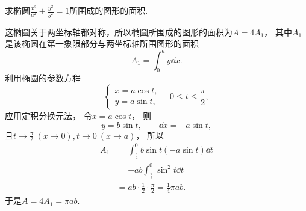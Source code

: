 \begin{example}
求椭圆\(\frac{x^2}{a^2}+\frac{y^2}{b^2}=1\)所围成的图形的面积.
\begin{solution}
这椭圆关于两坐标轴都对称，所以椭圆所围成的图形的面积为\(A=4A_1\)，
其中\(A_1\)是该椭圆在第一象限部分与两坐标轴所围图形的面积\begin{equation*}
	A_1 = \int_0^a y \dd{x}.
\end{equation*}
利用椭圆的参数方程\begin{equation*}
	\left\{ \begin{array}{l}
		x = a \cos t, \\
		y = a \sin t,
	\end{array} \right.
	\quad 0 \leq t \leq \frac\pi2,
\end{equation*}
应用定积分换元法，
令\(x = a \cos t\)，
则\begin{equation*}
	y = b \sin t, \qquad
	\dd{x} = -a \sin t,
\end{equation*}
且\(t \to \frac\pi2\ (x\to0),
t \to 0\ (x \to a)\)，
所以\begin{align*}
	A_1 &= \int_{\frac\pi2}^0 b \sin t (-a \sin t) \dd{t} \\
	&= -ab \int_{\frac\pi2}^0 \sin^2t \dd{t} \\
	&= ab \cdot \frac12 \cdot \frac\pi2
	= \frac14 \pi ab.
\end{align*}
于是\(A = 4 A_1 = \pi ab\).
\end{solution}
\end{example}

